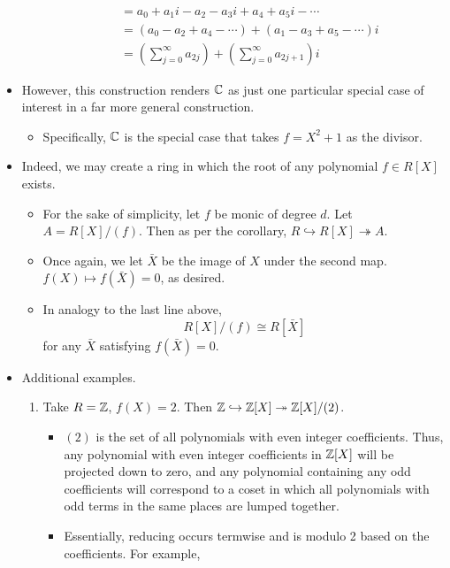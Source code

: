\documentclass[../notes.tex]{subfiles}
\begin{document}
\begin{itemize}
\begin{itemize}
\begin{align*}
            &= a_0+a_1i-a_2-a_3i+a_4+a_5i-\cdots\\
            &= (a_0-a_2+a_4-\cdots)+(a_1-a_3+a_5-\cdots)i\\
            &= \left( \sum_{j=0}^\infty a_{2j} \right)+\left( \sum_{j=0}^\infty a_{2j+1} \right)i
        \end{align*}
    \end{itemize}
    \item However, this construction renders $\mathbb{C}$ as just one particular special case of interest in a far more general construction.
    \begin{itemize}
        \item Specifically, $\mathbb{C}$ is the special case that takes $f=X^2+1$ as the divisor.
    \end{itemize}
    \item Indeed, we may create a ring in which the root of any polynomial $f\in R[X]$ exists.
    \begin{itemize}
        \item For the sake of simplicity, let $f$ be monic of degree $d$. Let $A=R[X]/(f)$. Then as per the corollary, $R\hookrightarrow R[X]\twoheadrightarrow A$.
        \item Once again, we let $\bar{X}$ be the image of $X$ under the second map. $f(X)\mapsto f(\bar{X})=0$, as desired.
        \item In analogy to the last line above,
        \begin{equation*}
            R[X]/(f) \cong R[\bar{X}]
        \end{equation*}
        for any $\bar{X}$ satisfying $f(\bar{X})=0$.
    \end{itemize}
    \item Additional examples.
    \begin{enumerate}
        \item Take $R=\mathbb{Z}$, $f(X)=2$. Then $\mathbb{Z}\hookrightarrow\mathbb{Z}[X]\twoheadrightarrow\mathbb{Z}[X]/(2)$.
        \begin{itemize}
            \item $(2)$ is the set of all polynomials with even integer coefficients. Thus, any polynomial with even integer coefficients in $\mathbb{Z}[X]$ will be projected down to zero, and any polynomial containing any odd coefficients will correspond to a coset in which all polynomials with odd terms in the same places are lumped together.
            \item Essentially, reducing occurs termwise and is modulo 2 based on the coefficients. For example,

\end{itemize}
\end{enumerate}
\end{itemize}
\end{document}
